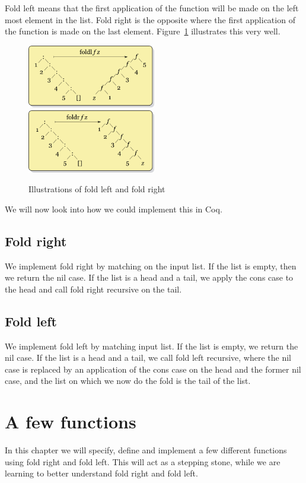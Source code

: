 \documentclass[a4paper]{article}
\begin{document}
Fold left means that the first application of the function will be made on the
left most element in the list. Fold right is the opposite where the first
application of the function is made on the last element. Figure~\ref{fig:folds}
illustrates this very well.

\begin{figure}[h]
\includegraphics[width=0.5\textwidth]{fold_left}
\includegraphics[width=0.5\textwidth]{fold_right}
\caption{Illustrations of fold left and fold right}
\label{fig:folds}
\end{figure}

We will now look into how we could implement this in Coq.

\subsection{Fold right} 
We implement fold right by matching on the input list. If the list is empty,
then we return the nil case. If the list is a head and a tail, we apply the cons
case to the head and call fold right recursive on the tail.

\subsection{Fold left}
We implement fold left by matching input list. If the list is empty, we
return the nil case. If the list is a head and a tail, we call fold left
recursive, where the nil case is replaced by an application of the cons case on
the head and the former nil case, and the list on which we now do the fold is
the tail of the list.

\section{A few functions}
In this chapter we will specify, define and implement a few different functions
using fold right and fold left. This will act as a stepping stone, while we are
learning to better understand fold right and fold left.
\end{document}
